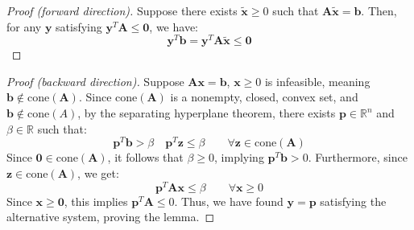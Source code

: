 \begin{proof}[Proof (forward direction)]
    Suppose there exists $\tilde{\mathbf{x}}\geq 0$ such that $\mathbf{A}\tilde{\mathbf{x}}=\mathbf{b}$. 
    Then, for any $\mathbf{y}$ satisfying  $\mathbf{y}^T\mathbf{A}\leq \mathbf{0}$, we have:
    \[\mathbf{y}^T\mathbf{b}=\mathbf{y}^T\mathbf{A}\tilde{\mathbf{x}}\leq \mathbf{0}\]
\end{proof}
\begin{proof}[Proof (backward direction)]
    Suppose $\mathbf{A}\mathbf{x}=\mathbf{b}$, $\mathbf{x}\geq 0$  is infeasible, meaning $\mathbf{b}\notin\text{cone}(\mathbf{A})$. 
    Since $\text{cone}(\mathbf{A})$ is a nonempty, closed, convex set, and $\mathbf{b}\notin\text{cone}(A)$, by the separating hyperplane theorem, there exists $\mathbf{p}\in\mathbb{R}^n$ and $\beta\in\mathbb{R}$ such that: 
    \[\mathbf{p}^T\mathbf{b}>\beta \quad\mathbf{p}^T\mathbf{z}\leq \beta \qquad\forall\mathbf{z}\in\text{cone}(\mathbf{A})\]
    Since $\mathbf{0}\in\text{cone}(\mathbf{A})$, it follows that $\beta\geq 0$, implying $\mathbf{p}^T\mathbf{b}>0$.
    Furthermore, since $\mathbf{z}\in\text{cone}(\mathbf{A})$, we get:
    \[\mathbf{p}^T\mathbf{A}\mathbf{x}\leq\beta\qquad\forall\mathbf{x}\geq 0\]
    Since $\mathbf{x}\geq \mathbf{0}$, this implies $\mathbf{p}^T\mathbf{A}\leq 0$.
    Thus, we have found $\mathbf{y}=\mathbf{p}$ satisfying the alternative system, proving the lemma.
\end{proof}